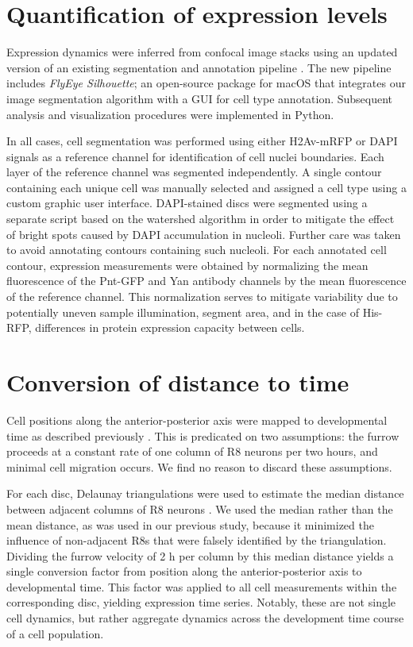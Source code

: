 \graphicspath{ {./figures/ratio/} }


\section{Quantification of expression levels}
\label{appendix:ratio:quantification}

Expression dynamics were inferred from confocal image stacks using an updated version of an existing segmentation and annotation pipeline \cite{Pelaez2015a}. The new pipeline includes \textit{FlyEye Silhouette}; an open-source package for macOS that integrates our image segmentation algorithm with a GUI for cell type annotation. Subsequent analysis and visualization procedures were implemented in Python.

In all cases, cell segmentation was performed using either H2Av-mRFP or DAPI signals as a reference channel for identification of cell nuclei boundaries. Each layer of the reference channel was segmented independently. A single contour containing each unique cell was manually selected and assigned a cell type using a custom graphic user interface. DAPI-stained discs were segmented using a separate script based on the watershed algorithm in order to mitigate the effect of bright spots caused by DAPI accumulation in nucleoli. Further care was taken to avoid annotating contours containing such nucleoli. For each annotated cell contour, expression measurements were obtained by normalizing the mean fluorescence of the Pnt-GFP and Yan antibody channels by the mean fluorescence of the reference channel. This normalization serves to mitigate variability due to potentially uneven sample illumination, segment area, and in the case of His-RFP, differences in protein expression capacity between cells.

\section{Conversion of distance to time}
\label{appendix:ratio:distance_to_time}

Cell positions along the anterior-posterior axis were mapped to developmental time as described previously \cite{Pelaez2015a,Pelaez2016}. This is predicated on two assumptions: the furrow proceeds at a constant rate of one column of R8 neurons per two hours, and minimal cell migration occurs. We find no reason to discard these assumptions.

For each disc, Delaunay triangulations were used to estimate the median distance between adjacent columns of R8 neurons \cite{Fortune1992}. We used the median rather than the mean distance, as was used in our previous study, because it minimized the influence of non-adjacent R8s that were falsely identified by the triangulation. Dividing the furrow velocity of 2 h per column by this median distance yields a single conversion factor from position along the anterior-posterior axis to developmental time. This factor was applied to all cell measurements within the corresponding disc, yielding expression time series. Notably, these are not single cell dynamics, but rather aggregate dynamics across the development time course of a cell population.

